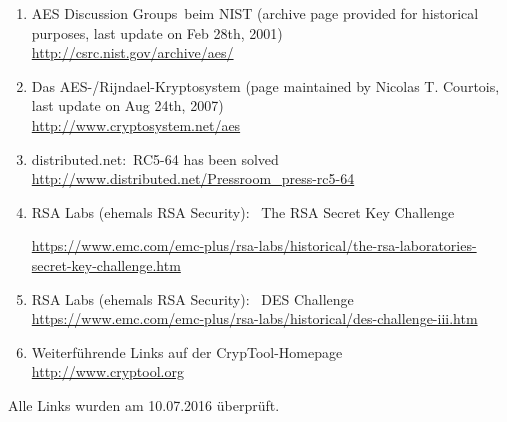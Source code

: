 \begin{enumerate}

  \hypertarget{CM_HT_Weblink_Rijndael-Cryptosystem}{}
  \item \glqq AES Discussion Groups\grqq~beim NIST (archive page provided for historical purposes, last update on Feb 28th, 2001)\\
	\url{http://csrc.nist.gov/archive/aes/}

  \item Das AES-/Rijndael-Kryptosystem (page maintained by Nicolas T. Courtois, last update on Aug 24th, 2007)\\
        \url{http://www.cryptosystem.net/aes}

  \item distributed.net:~\glqq RC5-64 has been solved\grqq\\
        \url{http://www.distributed.net/Pressroom_press-rc5-64}

\item RSA Labs (ehemals RSA Security): ~\glqq The RSA Secret Key Challenge\grqq
        \begin{sloppypar}
	\url{https://www.emc.com/emc-plus/rsa-labs/historical/the-rsa-laboratories-secret-key-challenge.htm}
	\end{sloppypar}

  \item RSA Labs (ehemals RSA Security): ~\glqq DES Challenge\grqq\\
        \url{https://www.emc.com/emc-plus/rsa-labs/historical/des-challenge-iii.htm}

  \item Weiterführende Links auf der CrypTool-Homepage\\
        \url{http://www.cryptool.org}
	       
\end{enumerate}

Alle Links wurden am 10.07.2016 überprüft.



